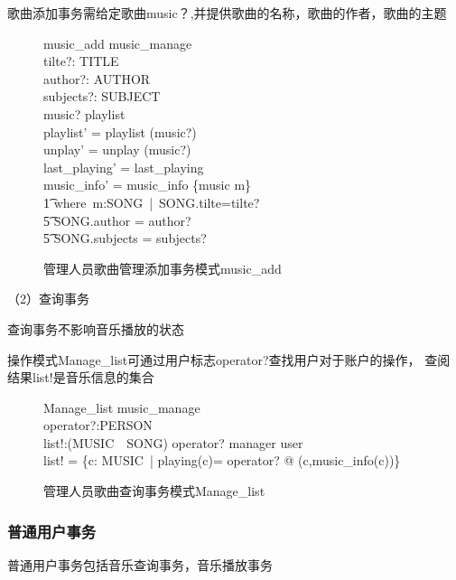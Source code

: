 \documentclass[14pt]{article}
\numberwithin{figure}{subsection}
\begin{document}
\vspace{-0.5cm}
歌曲添加事务需给定歌曲music？,并提供歌曲的名称，歌曲的作者，歌曲的主题
\vspace{-0.7cm}
\begin{figure}[H]
    \setlength{\abovecaptionskip}{0.cm}
    \setlength{\belowcaptionskip}{0.cm}
    \begin{schema}{music\_add}
        music\_manage\\
        tilte?: TITLE\\
        author?: \finset AUTHOR\\
        subjects?: \finset SUBJECT\\
        \where
        music? \not\in playlist\\
        playlist' = playlist \cup (music?)\\
        unplay' = unplay \cup (music?)\\
        last\_playing' = last\_playing\\
        music\_info' = music\_info \oplus \{music \mapsto m\}\\
        \t1 where\ m:SONG\ |\ SONG.tilte=tilte?\\
        \t5 \quad SONG.author = author?\\
        \t5 \quad SONG.subjects = subjects?
    \end{schema}
    \caption{管理人员歌曲管理添加事务模式music\_add}
\end{figure}

\clearpage
（2）查询事务

查询事务不影响音乐播放的状态

操作模式Manage\_list可通过用户标志operator?查找用户对于账户的操作，
查阅结果list!是音乐信息的集合
\vspace{-0.7cm}
\begin{figure}[H]
    \setlength{\abovecaptionskip}{0.cm}
    \setlength{\belowcaptionskip}{0.cm}
    \begin{schema}{Manage\_list}
        music\_manage\\
        operator?:PERSON\\
        list!:\finset (MUSIC\ \times\ SONG)
        \where
        operator? \in manager \cup user\\
        list! = \{c: MUSIC\ | playing(c)= operator? @ (c,music\_info(c))\}
    \end{schema}
    \caption{管理人员歌曲查询事务模式Manage\_list}
\end{figure}

\subsubsection{普通用户事务}
普通用户事务包括音乐查询事务，音乐播放事务
\end{document}
